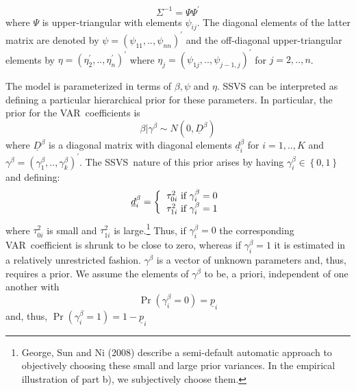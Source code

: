 \documentclass{article}
\begin{document}
\begin{equation*}
\Sigma ^{-1}=\Psi \Psi ^{\prime }
\end{equation*}%
where $\Psi $ is upper-triangular with elements $\psi _{ij}$. The diagonal
elements of the latter matrix are denoted by $\psi =\left( \psi
_{11},..,\psi _{nn}\right) ^{\prime }$ and the off-diagonal upper-triangular
elements by $\eta =\left( \eta _{2}^{\prime },..,\eta _{n}^{\prime }\right)
^{\prime }$ where $\eta _{j}=\left( \psi _{1j},..,\psi _{j-1,j}\right)
^{\prime }$ for $j=2,..,n$.

The model is parameterized in terms of $\beta ,\psi $ and $\eta $. SSVS can
be interpreted as defining a particular hierarchical prior for these
parameters. In particular, the prior for the VAR\ coefficients is%
\begin{equation}
\beta |\gamma ^{\beta }\sim N\left( 0,\underline{D}^{\beta }\right)
\label{SSVS_prior_beta}
\end{equation}%
where $\underline{D}^{\beta }$ is a diagonal matrix with diagonal elements $%
\underline{d}_{i}^{\beta }$ for $i=1,..,K$ and $\gamma ^{\beta }=\left(
\gamma _{1}^{\beta },..,\gamma _{k}^{\beta }\right) ^{\prime }$. The SSVS\
nature of this prior arises by having $\gamma _{i}^{\beta }\in \left\{
0,1\right\} $ and defining:%
\begin{equation*}
\underline{d}_{i}^{\beta }=\left\{ 
\begin{tabular}{l}
$\tau _{0i}^{2}$ if $\gamma _{i}^{\beta }=0$ \\ 
$\tau _{1i}^{2}$ if $\gamma _{i}^{\beta }=1$%
\end{tabular}%
\right.
\end{equation*}%
where $\tau _{0i}^{2}$ is small and $\tau _{1i}^{2}$ is large.\footnote{%
George, Sun and Ni (2008) describe a semi-default automatic approach to
objectively choosing these small and large prior variances. In the empirical
illustration of part b), we subjectively choose them.} Thus, if $\gamma
_{i}^{\beta }=0$ the corresponding VAR\ coefficient is shrunk to be close to
zero, whereas if $\gamma _{i}^{\beta }=1$ it is estimated in a relatively
unrestricted fashion. $\gamma ^{\beta }$ is a vector of unknown parameters
and, thus, requires a prior. We assume the elements of $\gamma ^{\beta }$ to
be, a priori, independent of one another with%
\begin{equation}
\Pr \left( \gamma _{i}^{\beta }=0\right) =\underline{p}_{i}
\label{SSVS_prior_gammab}
\end{equation}%
and, thus, $\Pr \left( \gamma _{i}^{\beta }=1\right) =1-\underline{p}_{i}$
\end{document}
